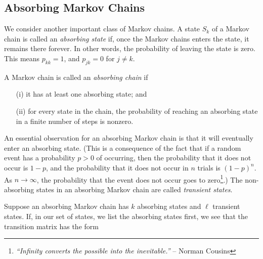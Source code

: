 \documentclass[reqno]{immbook}
\numberwithin{equation}{chapter}
\numberwithin{question}{section}
\numberwithin{theorem}{chapter}
\numberwithin{figure}{chapter}
\theoremstyle{definition}
\begin{document}
\subsection*{Absorbing Markov Chains}

We consider another important class of Markov chains.
A state $S_k$ of a Markov chain is called
an \emph{absorbing state} if, once the Markov chains enters
the state, it remains there forever.  In other words,
the probability of leaving the state is zero.
This means $p_{kk} = 1$, and $p_{jk} = 0$ for $j\ne k$.

A Markov chain is called an \emph{absorbing chain}
if
\begin{enumerate}
\item[(i)] it has at least one absorbing state; and
\item[(ii)] for every state in the chain, the probability
of reaching an absorbing state in a finite number
of steps is nonzero.
\end{enumerate}
An essential observation for an absorbing Markov chain
is that it will eventually enter an absorbing state.
(This is a consequence of the fact that if
a random event has a probability $p>0$ of occurring,
then the probability that it does not occur is $1-p$,
and the probability that it does not occur in $n$
trials is $(1-p)^n$.  As $n\rightarrow\infty$, the
probability that the event does not occur
goes to zero\footnote{%
\emph{``Infinity converts the possible into the inevitable.''}
 -- Norman Cousins 
}.)
The non-absorbing states in an absorbing Markov chain
are called \emph{transient states}.

\medskip
Suppose an absorbing Markov chain
has $k$ absorbing states and $\ell$ transient
states.
If, in our set of states, we list the absorbing
states first, we see that the
transition matrix has the form
\end{document}
